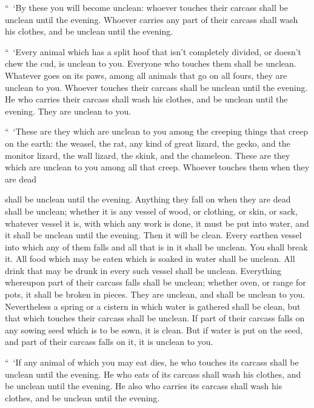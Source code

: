 \myverse{}“ ‘By these you will become unclean: whoever touches their carcass
shall be unclean until the evening.
\myverse{}Whoever carries any part of their carcass shall wash his clothes, and be
unclean until the evening.


\myverse{}“ ‘Every animal which has a split hoof that isn’t completely
divided, or doesn’t chew the cud, is unclean to you. Everyone who touches them shall be unclean.
\myverse{}Whatever goes on its paws, among all animals that go on all fours, they are
unclean to you. Whoever touches their carcass shall be unclean until the evening.
\myverse{}He who carries their carcass shall wash his clothes, and be unclean until
the evening. They are unclean to you.


\myverse{}“ ‘These are they which are unclean to you among the creeping
things that creep on the earth: the weasel, the rat, any kind of great lizard,
\myverse{}the gecko, and the monitor lizard, the wall lizard, the skink, and the chameleon.
\myverse{}These are they which are unclean to you among all that creep. Whoever touches
them when they are dead 



\noindent shall be unclean until the evening.
\myverse{}Anything they fall on when they are dead shall be unclean; whether it is
any vessel of wood, or clothing, or skin, or sack, whatever vessel it is, with which any work is done,
it must be put into water, and it shall be unclean until the evening. Then it will be clean.
\myverse{}Every earthen vessel into which any of them falls and all that is in it shall
be unclean. You shall break it.
\myverse{}All food which may be eaten which is soaked in water shall be unclean. All
drink that may be drunk in every such vessel shall be unclean.
\myverse{}Everything whereupon part of their carcass falls shall be unclean; whether
oven, or range for pots, it shall be broken in pieces. They are unclean, and shall be unclean to you.
\myverse{}Nevertheless a spring or a cistern in which water is gathered shall be clean,
but that which touches their carcass shall be unclean.
\myverse{}If part of their carcass falls on any sowing seed which is to be sown, it
is clean.
\myverse{}But if water is put on the seed, and part of their carcass falls on it, it
is unclean to you.


\myverse{}“ ‘If any animal of which you may eat dies, he who touches its
carcass shall be unclean until the evening.
\myverse{}He who eats of its carcass shall wash his clothes, and be unclean until the
evening. He also who carries its carcass shall wash his clothes, and be unclean until the evening.


